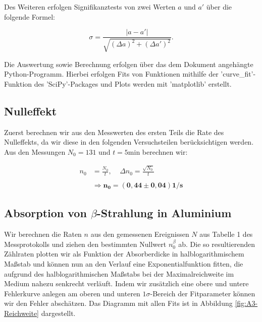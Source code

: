 \documentclass{article}
\begin{document}
Des Weiteren erfolgen Signifikanztests von zwei Werten $a$ und $a'$ über die folgende Formel:

\begin{equation}
    \sigma = \frac{|a-a'|}{\sqrt{(\Delta a)^2 + (\Delta a')^2}}.
\end{equation}

Die Auswertung sowie Berechnung erfolgen über das dem Dokument angehängte Python-Programm. Hierbei erfolgen Fits von Funktionen mithilfe der 'curve\_fit'-Funktion des 'SciPy'-Packages und Plots werden mit 'matplotlib' erstellt.


\newpage

\subsection{Nulleffekt}

Zuerst berechnen wir aus den Messwerten des ersten Teils die Rate des Nulleffekts, da wir diese in den folgenden Versuchsteilen berücksichtigen werden. Aus den Messungen $N_0 = 131$ und $t=5$min berechnen wir:

\begin{equation}
    \begin{split}
        n_0 &= \frac{N_0}{t}, \ \ \ \ \ \Delta n_0 = \frac{\sqrt{N_0}}{t} \\ \\
        &\Rightarrow \bm{n_0 = (0,44 \pm 0,04)} \textbf{1/s}
    \end{split}
\end{equation}

\subsection{Absorption von $\beta$-Strahlung in Aluminium}

Wir berechnen die Raten $n$ aus den gemessenen Ereignissen $N$ aus Tabelle 1 des Messprotokolls und ziehen den bestimmten Nullwert $n_0^\beta$ ab. Die so resultierenden Zählraten plotten wir als Funktion der Absorberdicke in halblogarithmischem Maßstab und können nun an den Verlauf eine Exponentialfunktion fitten, die aufgrund des halblogarithmischen Maßstabs bei der Maximalreichweite im Medium nahezu senkrecht verläuft. Indem wir zusätzlich eine obere und untere Fehlerkurve anlegen am oberen und unteren $1\sigma$-Bereich der Fitparameter können wir den Fehler abschätzen. Das Diagramm mit allen Fits ist in Abbildung \ref{fig:A3-Reichweite} dargestellt.
\end{document}
